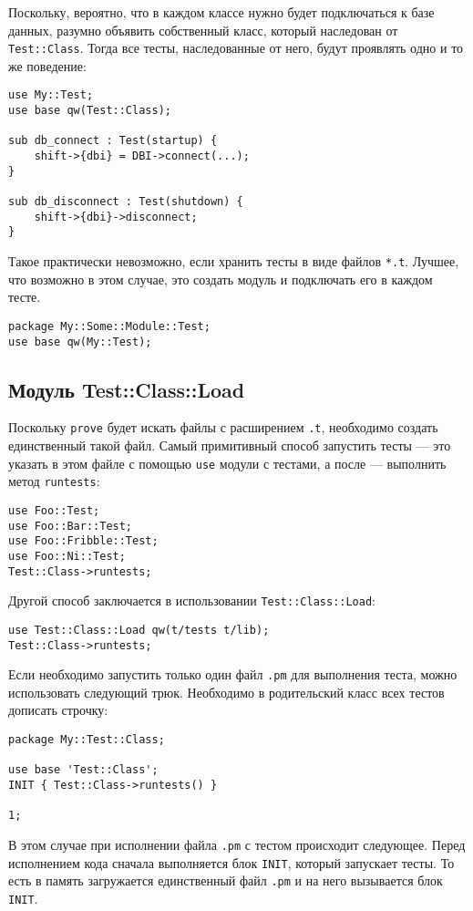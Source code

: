 Поскольку, вероятно, что в каждом классе нужно будет подключаться к базе данных, разумно объявить собственный класс, который наследован от \verb|Test::Class|. Тогда все тесты, наследованные от него, будут проявлять одно и то же поведение:
\begin{verbatim}
use My::Test;
use base qw(Test::Class);

sub db_connect : Test(startup) {
    shift->{dbi} = DBI->connect(...);
}

sub db_disconnect : Test(shutdown) {
    shift->{dbi}->disconnect;
}
\end{verbatim}
Такое практически невозможно, если хранить тесты в виде файлов \verb|*.t|. Лучшее, что возможно в этом случае, это создать модуль и подключать его в каждом тесте.
\begin{verbatim}
package My::Some::Module::Test;
use base qw(My::Test);
\end{verbatim}

\subsection{Модуль Test::Class::Load}
Поскольку \verb|prove| будет искать файлы с расширением \verb|.t|, необходимо создать единственный такой файл. Самый примитивный способ запустить тесты --- это указать в этом файле с помощью \verb|use| модули с тестами, а после --- выполнить метод \verb|runtests|:
\begin{verbatim}
use Foo::Test;
use Foo::Bar::Test;
use Foo::Fribble::Test;
use Foo::Ni::Test;
Test::Class->runtests;
\end{verbatim}
Другой способ заключается в использовании \verb|Test::Class::Load|:
\begin{verbatim}
use Test::Class::Load qw(t/tests t/lib);
Test::Class->runtests;
\end{verbatim}

Если необходимо запустить только один файл \verb|.pm| для выполнения теста, можно использовать следующий трюк. Необходимо в родительский класс всех тестов дописать строчку:
\begin{verbatim}
package My::Test::Class;

use base 'Test::Class';
INIT { Test::Class->runtests() }

1;
\end{verbatim}
В этом случае при исполнении файла \verb|.pm| с тестом происходит следующее. Перед исполнением кода сначала выполняется блок \verb|INIT|, который запускает тесты. То есть в память загружается единственный файл \verb|.pm| и на него вызывается блок \verb|INIT|.

